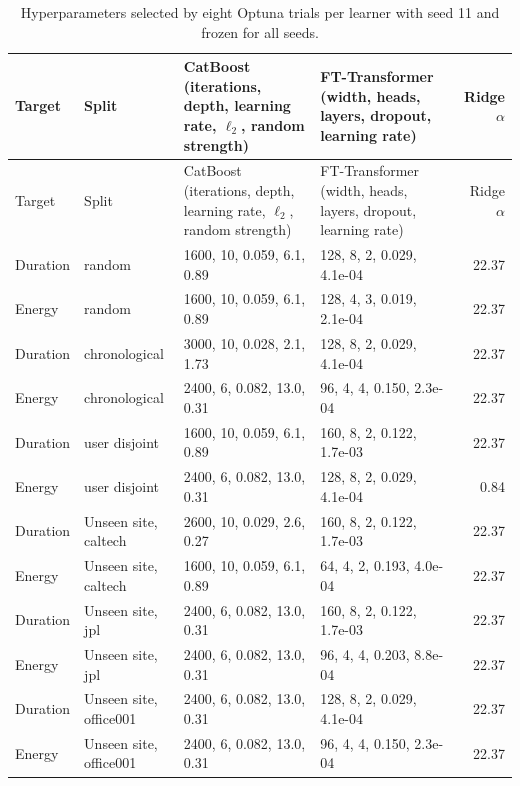 {\scriptsize\begin{longtable}{llp{4.6cm}p{4.6cm}r}
\caption{Hyperparameters selected by eight Optuna trials per learner with seed 11 and frozen for all seeds.}\label{tab:s-hp}\\
\toprule
Target & Split & CatBoost (iterations, depth, learning rate, $\ell_2$, random strength) & FT-Transformer (width, heads, layers, dropout, learning rate) & Ridge $\alpha$ \\
\midrule
\endfirsthead
\toprule
Target & Split & CatBoost (iterations, depth, learning rate, $\ell_2$, random strength) & FT-Transformer (width, heads, layers, dropout, learning rate) & Ridge $\alpha$ \\
\midrule
\endhead
\bottomrule
\endfoot
Duration & random & 1600, 10, 0.059, 6.1, 0.89 & 128, 8, 2, 0.029, 4.1e-04 & 22.37 \\
Energy & random & 1600, 10, 0.059, 6.1, 0.89 & 128, 4, 3, 0.019, 2.1e-04 & 22.37 \\
Duration & chronological & 3000, 10, 0.028, 2.1, 1.73 & 128, 8, 2, 0.029, 4.1e-04 & 22.37 \\
Energy & chronological & 2400, 6, 0.082, 13.0, 0.31 & 96, 4, 4, 0.150, 2.3e-04 & 22.37 \\
Duration & user disjoint & 1600, 10, 0.059, 6.1, 0.89 & 160, 8, 2, 0.122, 1.7e-03 & 22.37 \\
Energy & user disjoint & 2400, 6, 0.082, 13.0, 0.31 & 128, 8, 2, 0.029, 4.1e-04 & 0.84 \\
Duration & Unseen site, caltech & 2600, 10, 0.029, 2.6, 0.27 & 160, 8, 2, 0.122, 1.7e-03 & 22.37 \\
Energy & Unseen site, caltech & 1600, 10, 0.059, 6.1, 0.89 & 64, 4, 2, 0.193, 4.0e-04 & 22.37 \\
Duration & Unseen site, jpl & 2400, 6, 0.082, 13.0, 0.31 & 160, 8, 2, 0.122, 1.7e-03 & 22.37 \\
Energy & Unseen site, jpl & 2400, 6, 0.082, 13.0, 0.31 & 96, 4, 4, 0.203, 8.8e-04 & 22.37 \\
Duration & Unseen site, office001 & 2400, 6, 0.082, 13.0, 0.31 & 128, 8, 2, 0.029, 4.1e-04 & 22.37 \\
Energy & Unseen site, office001 & 2400, 6, 0.082, 13.0, 0.31 & 96, 4, 4, 0.150, 2.3e-04 & 22.37 \\
\end{longtable}}

